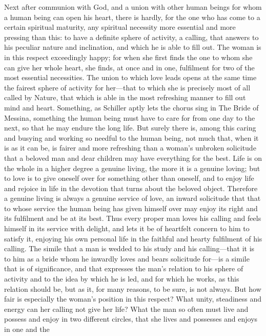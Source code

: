 \documentclass[12pt,a4paper]{book}
\begin{document}
Next after communion with God, and a union with other human beings for
whom a human being can open his heart, there is hardly, for the one who has
come to a certain spiritual maturity, any spiritual necessity more
essential and more pressing than this: to have a definite sphere of
activity, a calling, that answers to his peculiar nature and inclination,
and which he is able to fill out. The woman is in this respect exceedingly
happy; for when she first finds the one to whom she can give her whole
heart, she finds, at once and in one, fulfilment for two of the most
essential necessities. The union to which love leads opens at the same time
the fairest sphere of activity for her---that to which she is precisely most
of all called by Nature, that which is able in the most refreshing manner
to fill out mind and heart. Something, as Schiller aptly lets the chorus
sing in The Bride of Messina, something the human being must have to care
for from one day to the next, so that he may endure the long life. But
surely there is, among this caring and busying and working so needful to
the human being, not much that, when it is as it can be, is fairer and more
refreshing than a woman's unbroken solicitude that a beloved man and dear
children may have everything for the best. Life is on the whole in a higher
degree a genuine living, the more it is a genuine loving; but to love is to
give oneself over for something other than oneself, and to enjoy life and
rejoice in life in the devotion that turns about the beloved object.
Therefore a genuine living is always a genuine service of love, an inward
solicitude that that to whose service the human being has given himself
over may enjoy its right and its fulfilment and be at its best. Thus every
proper man loves his calling and feels himself in its service with delight,
and lets it be of heartfelt concern to him to satisfy it, enjoying his own
personal life in the faithful and hearty fulfilment of his calling. The
simile that a man is wedded to his study and his calling---that it is to
him as a bride whom he inwardly loves and bears solicitude for---is a simile
that is of significance, and that expresses the man's relation to his
sphere of activity and to the idea by which he is led, and for which he
works, as this relation should be, but as it, for many reasons, to be sure,
is not always. But how fair is especially the woman's position in this
respect? What unity, steadiness and energy can her calling not give her
life? What the man so often must live and possess and enjoy in two
different circles, that she lives and possesses and enjoys in one and the
\end{document}
